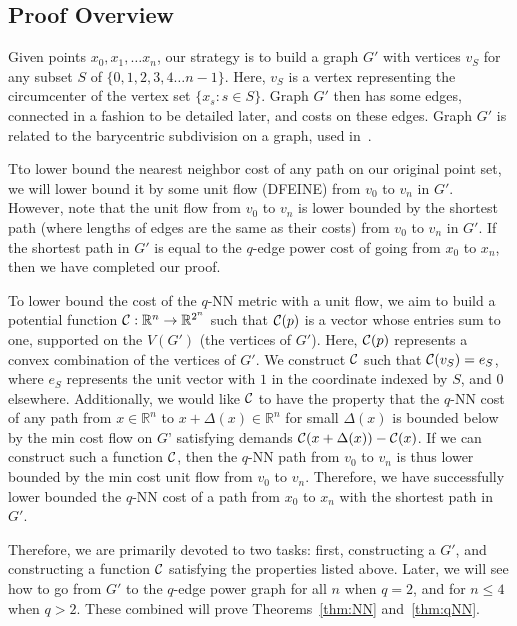\subsection{Proof Overview}

Given points $x_0, x_1, \ldots x_n$, our strategy is to build a graph $G'$ with
vertices $v_S$ for any subset $S$ of
$\{0,1,2,3,4 \ldots n-1 \}$. Here, $v_S$ is a vertex representing the
circumcenter of the vertex set $\{x_s: s \in S\}$. Graph $G'$ then has some
edges, connected in a fashion to be detailed later, and costs on these edges.
Graph $G'$ is related to the barycentric subdivision on a graph, used
in~\cite{}.

Tto lower bound the nearest neighbor cost of any path on our original point
set, we will lower bound it by some unit flow (DFEINE) from $v_0$ to $v_n$
in $G'$. However, note that the unit flow from $v_0$ to $v_n$ is lower
bounded by the shortest path (where lengths of edges are the same as their
costs) from $v_0$ to $v_n$ in $G'$. If the shortest path in $G'$ is equal
to the $q$-edge power cost of going from $x_0$ to $x_n$, then we have
completed our proof.

To lower bound the cost of the $q$-NN metric with a unit flow, we aim to build
a potential function $\mathcal{C}:\mathbb{R}^n \rightarrow \mathbb{R}^{2^n}$ such
that $\mathcal{C}(p)$ is a vector whose entries sum to one, supported on the $ V(G')$ (the vertices of
$G'$). Here, $\mathcal{C}(p)$
represents a convex combination of the vertices of $G'$. We construct $\mathcal{C}$
such that $\mathcal{C}(v_S) = e_S$, where $e_S$ represents the unit vector with $1$
in the coordinate indexed by $S$, and $0$ elsewhere. Additionally, we would
like $\mathcal{C}$ to have
the property that the $q$-NN cost of any path from $x \in \mathbb{R}^n$ to
$x+\Delta(x) \in \mathbb{R}^n$ for small $\Delta(x)$ is
bounded below by the min cost flow on $G’$ satisfying demands
$\mathcal{C}(x+\Delta(x)) - \mathcal{C}(x)$. If we can construct such a function $\mathcal{C}$,
then the $q$-NN path from $v_0$ to $v_n$ is thus lower bounded by the min cost
unit flow from $v_0$ to $v_n$.
 Therefore, we have successfully lower bounded
the $q$-NN cost of a path from $x_0$ to $x_n$ with the shortest path in $G'$.

Therefore, we are primarily devoted to two tasks: first,
constructing a $G'$, and constructing a function
$\mathcal{C}$ satisfying the properties listed above.  Later, we will see how to
go from $G'$ to the $q$-edge power graph for all $n$ when $q=2$, and for $
n\leq 4$ when $q > 2$. These combined will prove Theorems~\ref{thm:NN}
and~\ref{thm:qNN}.

